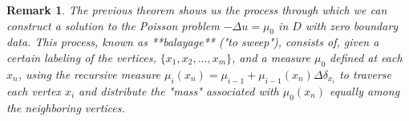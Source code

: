 \documentclass{article}
\newtheorem{remark}{Remark}
\begin{document}
\begin{remark}
   The previous theorem shows us the process through which we can construct a solution to the Poisson problem $-\Delta u = \mu_0$ in $D$ with zero boundary data. This process, known as **balayage** ("to sweep"), consists of, given a certain labeling of the vertices, $\{x_1, x_2, ..., x_m\}$, and a measure $\mu_0$ defined at each $x_n$, using the recursive measure $\mu_i(x_n) = \mu_{i-1} + \mu_{i-1}(x_n)\Delta \delta_{x_i}$ to traverse each vertex $x_i$ and distribute the "mass" associated with $\mu_0(x_n)$ equally among the neighboring vertices.


    \begin{center}
    


\begin{tikzpicture}[x=0.75pt,y=0.75pt,yscale=-1,xscale=1]


\end{tikzpicture}
\end{center}
\end{remark}
\end{document}

